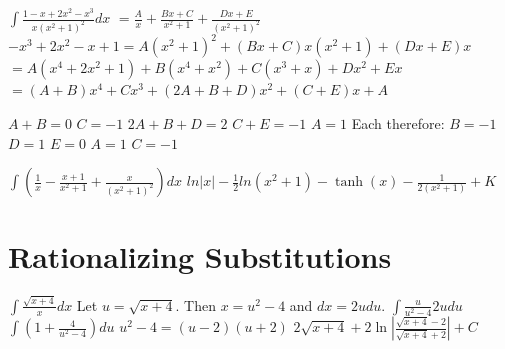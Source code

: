 \documentclass{article}
\begin{document}
$\int \frac{1-x+2x^2-x^3}{x(x^2 +1)^2}dx$
\newline
$ = \frac{A}{x} + \frac{Bx+C}{x^2+1} + \frac{Dx+E}{(x^2+1)^2}$
\newline
$-x^3 + 2x^2 -x + 1 = A(x^2+1)^2 + (Bx+C)x(x^2+1) + (Dx+E)x$
\newline
$ = A(x^4 +2x^2+1) + B(x^4 +x^2)+ C(x^3 +x) + Dx^2 + Ex$
\newline
$ = (A+B)x^4 + Cx^3 + (2A+B+D)x^2 + (C+E)x + A$

$A+B = 0$
$C = -1$
$2A+B+D = 2$
$C+E = -1$
$A = 1$
Each therefore:
$B = -1$
$D = 1$
$E = 0$
$A = 1$
$C = -1$

$\int (\frac{1}{x} - \frac{x+1}{x^2+1} + \frac{x}{(x^2+1)^2})dx$
$ln|x|-\frac{1}{2}ln(x^2+1)-\tanh(x)-\frac{1}{2(x^2+1)} + K$


\section{Rationalizing Substitutions}

$\int \frac{\sqrt{x+4}}{x}dx$
\newline
Let $u = \sqrt{x+4}$. Then $x = u^2 -4$ and $dx = 2udu$.
\newline
$\int \frac{u}{u^2-4}2udu$
\newline
$\int (1+\frac{4}{u^2-4})du$
\newline
$u^2 -4 = (u-2)(u+2)$
\newline
$2\sqrt{x+4}+2\ln|\frac{\sqrt{x+4}-2}{\sqrt{x+4}+2}| + C$
\end{document}
